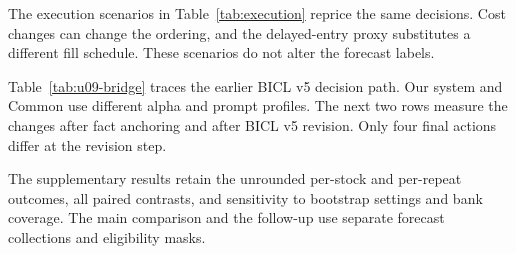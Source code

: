 \noindent\begin{minipage}{\linewidth}
The execution scenarios in Table~\ref{tab:execution} reprice the same
decisions. Cost changes can change the ordering, and the delayed-entry
proxy substitutes a different fill schedule. These scenarios do not
alter the forecast labels.



Table~\ref{tab:u09-bridge} traces the earlier BICL v5 decision path. Our
system and Common use different alpha and prompt profiles. The next two
rows measure the changes after fact anchoring and after BICL v5 revision.
Only four final actions differ at the revision step.



The supplementary results retain the unrounded per-stock and per-repeat
outcomes, all paired contrasts, and sensitivity to bootstrap settings and
bank coverage. The main comparison and the follow-up use separate
forecast collections and eligibility masks.
\end{minipage}
